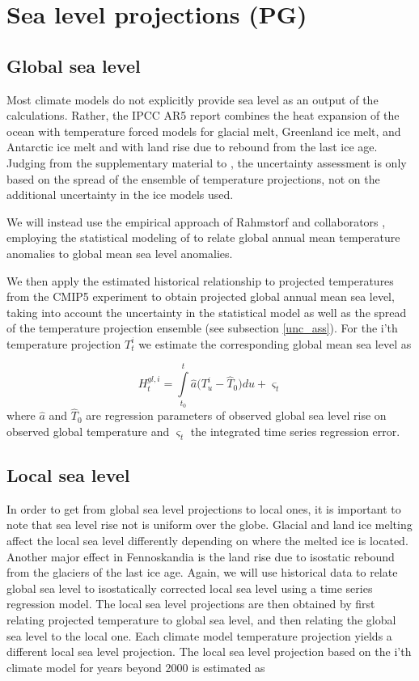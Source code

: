 \documentclass[draft,linenumbers]{agujournal}
\begin{document}
\section{Sea level projections {\color{blue} (PG)}}

\label{sealevelproj}

\subsection{Global sea level}
Most climate models do not explicitly provide sea level as an output of the calculations. Rather, the IPCC AR5 report \citep[ch.~13]{ipcc} combines the heat expansion of the ocean with temperature forced models for glacial melt, Greenland ice melt, and Antarctic ice melt and with land rise due to rebound from the last ice age. Judging from the supplementary material to \citet[ch.~13]{ipcc}, the uncertainty assessment is only based on the spread of the ensemble of temperature projections, not on the additional uncertainty in the ice models used.

We will instead use the empirical approach of Rahmstorf and collaborators \citep{Rahmstorf07,Rahmstorf11}, employing the statistical modeling of \citet{Bolin2014a} to relate global annual mean temperature anomalies to global mean sea level anomalies. 


We then apply the estimated historical relationship to projected temperatures from the CMIP5 experiment \citep{cmip5} to obtain projected global annual mean sea level, taking into account the uncertainty in the statistical model as well as the spread of the temperature projection ensemble (see subsection \ref{unc_ass}). 
For the i'th temperature projection $T_t^i$ we estimate the corresponding global mean sea level as

\[H_t^{gl,i} = \int\limits_{{t_0}}^t {{\hat a} (T_u^i - {{\hat T}_0}} )du + {\varsigma _t}\]
where ${\hat a}$ and ${\hat T}_0$ are regression parameters of observed global sea level  rise on observed global temperature and $\varsigma_t$ the integrated time series regression error.



\subsection{Local sea level}
In order to get from global sea level projections to local ones, it is important to note that sea level rise not is uniform over the globe. Glacial and land ice melting affect the local sea level differently depending on where the melted ice is located.
Another major effect in Fennoskandia is the land rise due to isostatic rebound from the glaciers of the last ice age. 
Again, we will use historical data to relate global sea level to isostatically corrected local sea level using a time series regression model. 
The local sea level projections are then obtained by first relating projected temperature to global sea level, and then relating the global sea level to the local one. Each climate model temperature projection yields a different local sea level projection. The local sea level projection based on the i'th climate model for years beyond 2000 is estimated as
\end{document}
